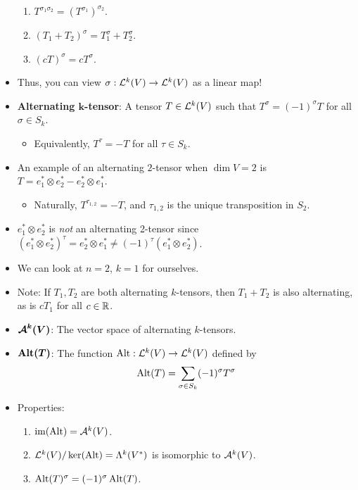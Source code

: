 \documentclass[../notes.tex]{subfiles}
\begin{document}
\begin{itemize}
\begin{enumerate}
        \item $T^{\sigma_1\sigma_2}=(T^{\sigma_1})^{\sigma_2}$.
        \item $(T_1+T_2)^\sigma=T_1^\sigma+T_2^\sigma$.
        \item $(cT)^\sigma=cT^\sigma$.
    \end{enumerate}
    \item Thus, you can view $\sigma:\lin[k]{V}\to\lin[k]{V}$ as a linear map!
    \item \textbf{Alternating $\bm{k}$-tensor}: A tensor $T\in\lin[k]{V}$ such that $T^\sigma=(-1)^\sigma T$ for all $\sigma\in S_k$.
    \begin{itemize}
        \item Equivalently, $T^\tau=-T$ for all $\tau\in S_k$.
    \end{itemize}
    \item An example of an alternating $2$-tensor when $\dim V=2$ is $T=e_1^*\otimes e_2^*-e_2^*\otimes e_1^*$.
    \begin{itemize}
        \item Naturally, $T^{\tau_{1,2}}=-T$, and $\tau_{1,2}$ is the unique transposition in $S_2$.
    \end{itemize}
    \item $e_1^*\otimes e_2^*$ is \emph{not} an alternating 2-tensor since $(e_1^*\otimes e_2^*)^\tau=e_2^*\otimes e_1^*\neq(-1)^\tau(e_1^*\otimes e_2^*)$.
    \item We can look at $n=2$, $k=1$ for ourselves.
    \item Note: If $T_1,T_2$ are both alternating $k$-tensors, then $T_1+T_2$ is also alternating, as is $cT_1$ for all $c\in\R$.
    \item $\bm{\alt[k]{V}}$: The vector space of alternating $k$-tensors.
    \item $\bm{\Alt(T)}$: The function $\Alt:\lin[k]{V}\to\lin[k]{V}$ defined by
    \begin{equation*}
        \Alt(T) = \sum_{\sigma\in S_k}(-1)^\sigma T^\sigma
    \end{equation*}
    \item Properties:
    \begin{enumerate}
        \item $\im(\Alt)=\alt[k]{V}$.
        \item $\lin[k]{V}/\ker(\Alt)=\lam[k]{V^*}$ is isomorphic to $\alt[k]{V}$.
        \item $\Alt(T)^\sigma=(-1)^\sigma\Alt(T)$.
        \begin{itemize}

\end{itemize}
\end{enumerate}
\end{itemize}
\end{document}
